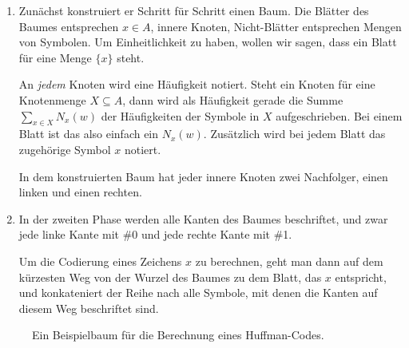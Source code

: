 \begin {enumerate}
\item Zunächst konstruiert er Schritt für Schritt einen Baum. Die
  Blätter des Baumes entsprechen $x\in A$, innere Knoten, \dh
  Nicht-Blätter entsprechen Mengen von Symbolen.
  Um Einheitlichkeit zu haben, wollen wir sagen, dass ein Blatt für
  eine Menge $\{x\}$ steht.
  
  An \emph{jedem} Knoten wird eine Häufigkeit notiert.
  Steht ein Knoten für eine Knotenmenge $X\subseteq A$, dann wird als
  Häufigkeit gerade die Summe $\sum_{x\in X} N_x(w)$ der Häufigkeiten
  der Symbole in $X$ aufgeschrieben. 
  Bei einem Blatt ist das also einfach ein $N_x(w)$.
  Zusätzlich wird bei jedem Blatt das zugehörige Symbol $x$ notiert.

  In dem konstruierten Baum hat jeder innere Knoten zwei Nachfolger,
  einen linken und einen rechten.
\item In der zweiten Phase werden alle Kanten des Baumes beschriftet,
  und zwar jede linke Kante mit \#0 und jede rechte Kante mit \#1.

  Um die Codierung eines Zeichens $x$ zu berechnen, geht man dann auf
  dem kürzesten Weg von der Wurzel des Baumes zu dem Blatt, das $x$
  entspricht, und konkateniert der Reihe nach alle Symbole, mit denen
  die Kanten auf diesem Weg beschriftet sind.
\end{enumerate}
%
\begin{figure}[b]
  \centering
  \caption{Ein Beispielbaum für die Berechnung eines Huffman-Codes.}
  \label{abb:huffman-baum}
\end{figure}
